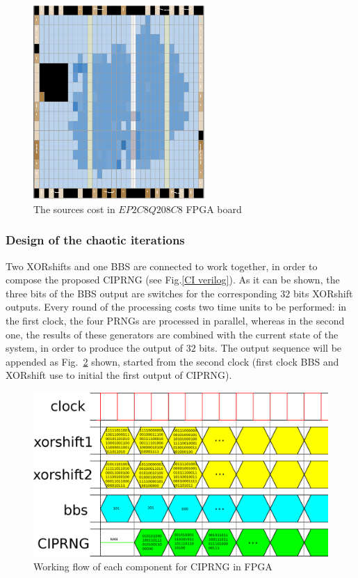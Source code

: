 \begin{figure}
\begin{center}
  \includegraphics[width=6.5cm]{print.eps}
\end{center}
\caption{The sources cost in $EP2C8Q208C8$ FPGA board}
 \label{logic elements}
\end{figure}

\subsubsection{Design of the chaotic iterations}
Two XORshifts and one BBS are connected to work together, in order to compose the
proposed CIPRNG (see Fig.\ref{CI verilog}). 
As it can be shown, the three bits of the BBS output are switches for the corresponding $32$ bits XORshift outputs. Every round of the 
 processing costs two time units
 to be performed: in the first clock, 
the four PRNGs are processed in parallel,
whereas in the second one, the results of these generators are combined with 
the current state of the system, in order to produce the output of $32$ bits. The output sequence will be appended as Fig.~\ref{ci_OUTPUT} shown, started from the second clock (first clock BBS and XORshift use to initial the first output of CIPRNG).

\begin{figure}
\begin{center}
  \includegraphics[width=14cm]{ci_OUTPUT.eps}
\end{center}
\caption{Working flow of each component for CIPRNG in FPGA}
 \label{ci_OUTPUT}
\end{figure}

